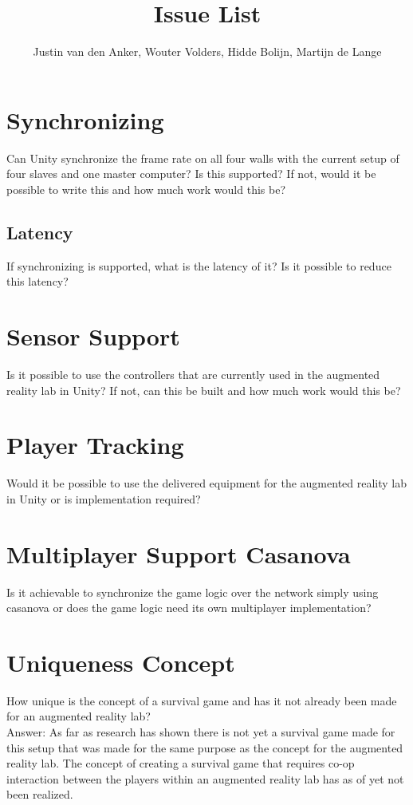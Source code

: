 \documentclass[10pt,a4paper]{article}
\author{Justin van den Anker, Wouter Volders, Hidde Bolijn, Martijn de Lange}
\title{Issue List}
\begin{document}
\maketitle
\section{Synchronizing}
Can Unity synchronize the frame rate on all four walls with the current setup of four slaves and one master computer? Is this supported? If not, would it be possible to write this and how much work would this be?
\subsection{Latency}
If synchronizing is supported, what is the latency of it? Is it possible to reduce this latency?

\section{Sensor Support}
Is it possible to use the controllers that are currently used in the augmented reality lab in Unity? If not, can this be built and how much work would this be?

\section{Player Tracking}
Would it be possible to use the delivered equipment for the augmented reality lab in Unity or is implementation required?


\section{Multiplayer Support Casanova}
Is it achievable to synchronize the game logic over the network simply using casanova or does the game logic need its own multiplayer implementation?

\section{Uniqueness Concept}
How unique is the concept of a survival game and has it not already been made for an augmented reality lab?
\\

Answer: As far as research has shown there is not yet a survival game made for this setup that was made for the same purpose as the concept for the augmented reality lab. The concept of creating a survival game that requires co-op interaction between the players within an augmented reality lab has as of yet not been realized.
\end{document}
